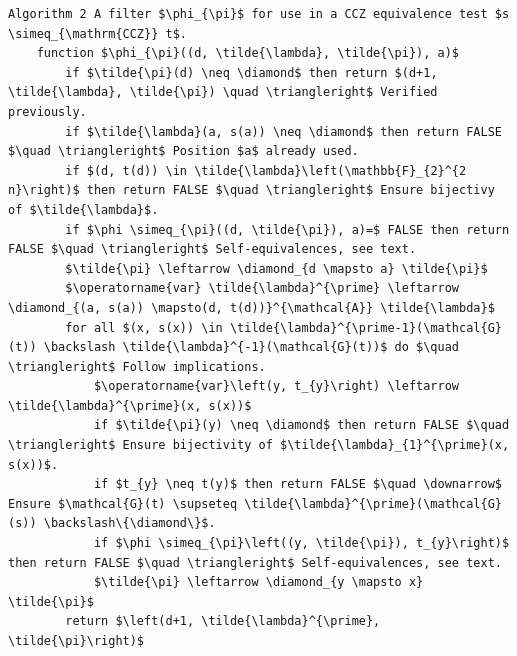 \documentclass[10pt]{article}
\begin{document}
\begin{verbatim}
Algorithm 2 A filter $\phi_{\pi}$ for use in a CCZ equivalence test $s \simeq_{\mathrm{CCZ}} t$.
    function $\phi_{\pi}((d, \tilde{\lambda}, \tilde{\pi}), a)$
        if $\tilde{\pi}(d) \neq \diamond$ then return $(d+1, \tilde{\lambda}, \tilde{\pi}) \quad \triangleright$ Verified previously.
        if $\tilde{\lambda}(a, s(a)) \neq \diamond$ then return FALSE $\quad \triangleright$ Position $a$ already used.
        if $(d, t(d)) \in \tilde{\lambda}\left(\mathbb{F}_{2}^{2 n}\right)$ then return FALSE $\quad \triangleright$ Ensure bijectivy of $\tilde{\lambda}$.
        if $\phi \simeq_{\pi}((d, \tilde{\pi}), a)=$ FALSE then return FALSE $\quad \triangleright$ Self-equivalences, see text.
        $\tilde{\pi} \leftarrow \diamond_{d \mapsto a} \tilde{\pi}$
        $\operatorname{var} \tilde{\lambda}^{\prime} \leftarrow \diamond_{(a, s(a)) \mapsto(d, t(d))}^{\mathcal{A}} \tilde{\lambda}$
        for all $(x, s(x)) \in \tilde{\lambda}^{\prime-1}(\mathcal{G}(t)) \backslash \tilde{\lambda}^{-1}(\mathcal{G}(t))$ do $\quad \triangleright$ Follow implications.
            $\operatorname{var}\left(y, t_{y}\right) \leftarrow \tilde{\lambda}^{\prime}(x, s(x))$
            if $\tilde{\pi}(y) \neq \diamond$ then return FALSE $\quad \triangleright$ Ensure bijectivity of $\tilde{\lambda}_{1}^{\prime}(x, s(x))$.
            if $t_{y} \neq t(y)$ then return FALSE $\quad \downarrow$ Ensure $\mathcal{G}(t) \supseteq \tilde{\lambda}^{\prime}(\mathcal{G}(s)) \backslash\{\diamond\}$.
            if $\phi \simeq_{\pi}\left((y, \tilde{\pi}), t_{y}\right)$ then return FALSE $\quad \triangleright$ Self-equivalences, see text.
            $\tilde{\pi} \leftarrow \diamond_{y \mapsto x} \tilde{\pi}$
        return $\left(d+1, \tilde{\lambda}^{\prime}, \tilde{\pi}\right)$
\end{verbatim}
\end{document}
